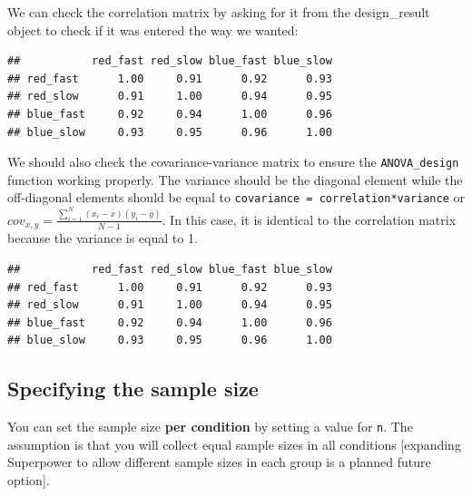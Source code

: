 \documentclass[]{book}
\newenvironment{Shaded}{\begin{snugshade}}{\end{snugshade}}
\newcommand{\NormalTok}[1]{#1}
\newcommand{\OperatorTok}[1]{\textcolor[rgb]{0.81,0.36,0.00}{\textbf{#1}}}
\begin{document}
We can check the correlation matrix by asking for it from the design\_result object to check if it was entered the way we wanted:

\begin{Shaded}
\end{Shaded}

\begin{verbatim}
##           red_fast red_slow blue_fast blue_slow
## red_fast      1.00     0.91      0.92      0.93
## red_slow      0.91     1.00      0.94      0.95
## blue_fast     0.92     0.94      1.00      0.96
## blue_slow     0.93     0.95      0.96      1.00
\end{verbatim}

We should also check the covariance-variance matrix to ensure the \texttt{ANOVA\_design} function working properly.
The variance should be the diagonal element while the off-diagonal elements should be equal to \texttt{covariance\ =\ correlation*variance} or \(cov_{x,y}=\frac{\sum_{i=1}^{N}(x_{i}-\bar{x})(y_{i}-\bar{y})}{N-1}\).
In this case, it is identical to the correlation matrix because the variance is equal to 1.

\begin{Shaded}
\end{Shaded}

\begin{verbatim}
##           red_fast red_slow blue_fast blue_slow
## red_fast      1.00     0.91      0.92      0.93
## red_slow      0.91     1.00      0.94      0.95
## blue_fast     0.92     0.94      1.00      0.96
## blue_slow     0.93     0.95      0.96      1.00
\end{verbatim}

\hypertarget{specifying-the-sample-size}{%
\subsection{Specifying the sample size}\label{specifying-the-sample-size}}

You can set the sample size \textbf{per condition} by setting a value for \texttt{n}. The assumption is that you will collect equal sample sizes in all conditions {[}expanding Superpower to allow different sample sizes in each group is a planned future option{]}.
\end{document}
